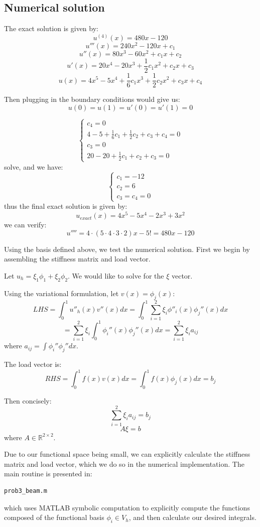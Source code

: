 \documentclass[12pt]{article} %
\newcommand{\rr}{\mathbb{R}}
\begin{document}
\subsection{Numerical solution}
The exact solution is given by:
$$
	u^{(4)}(x) = 480x-120
$$
$$
	u'''(x) = 240x^2 - 120x +c_1
$$
$$
	u''(x) = 80x^3 - 60x^2 + c_1x + c_2
$$
$$
	u'(x) = 20x^4 - 20x^3 + \frac12 c_1x^2 + c_2x + c_3
$$
$$
	u(x) = 4x^5 - 5x^4 + \frac16 c_1x^3 + \frac12 c_2x^2 + c_3x + c_4
$$

Then plugging in the boundary conditions would give us:
$$
	u(0) = u(1) = u'(0) = u'(1) = 0
$$

$$
	\begin{cases}
		c_4 = 0 \\
		4-5+\frac16 c_1 + \frac12 c_2 + c_3 +c_4= 0\\
		c_3 = 0 \\
		20 - 20 + \frac12c_1 + c_2 + c_3 = 0
	\end{cases}
$$ solve, and we have:
$$
	\begin{cases}
		c_1 = -12\\
		c_2 = 6\\
		c_3 = c_4 = 0
	\end{cases}
$$ thus the final exact solution is given by:
$$
	u_{exact}(x) = 4x^5 - 5x^4 - 2x^3 + 3x^2
$$ we can verify:
$$
	u'''' = 4 \cdot (5\cdot 4\cdot 3\cdot 2)x - 5! = 480x - 120
$$


Using the basis defined above, we test the numerical solution. First we begin by assembling the stiffness matrix and load vector.

Let $u_h = \xi_1\phi_1 + \xi_2\phi_2$. We would like to solve for the $\xi$ vector.

Using the variational formulation, let $v(x) = \phi_j(x)$:
$$
	LHS = \int_0^1 u''_h(x)v''(x)dx
	= \int_0^1 \sum_{i=1}^{2}\xi_i\phi''_i(x) \phi_j''(x)dx
$$
$$
	= \sum_{i=1}^{2}\xi_i\int_{0}^{1}\phi_i''(x)\phi_j''(x)dx = \sum_{i=1}^{2}\xi_ia_{ij}
$$ where $a_{ij} = \int\phi_i''\phi_j''dx$.

The load vector is:
$$
	RHS = \int_0^1f(x)v(x)dx
	= \int_{0}^{1}f(x)\phi_j(x)dx = b_j
$$

Then concisely:
$$
	\sum_{i=1}^{2}\xi_ia_{ij} = b_j
$$
$$
	A\xi = b
$$ where $A\in\rr^{2\times 2}$. 

Due to our functional space being small, we can explicitly calculate the stiffness matrix and load vector, which we do so in the numerical implementation. The main routine is presented in:
\begin{verbatim}
prob3_beam.m
\end{verbatim} which uses MATLAB symbolic computation to explicitly compute the functions composed of the functional basis $\phi_i\in V_h$, and then calculate our desired integrals.
\end{document}
